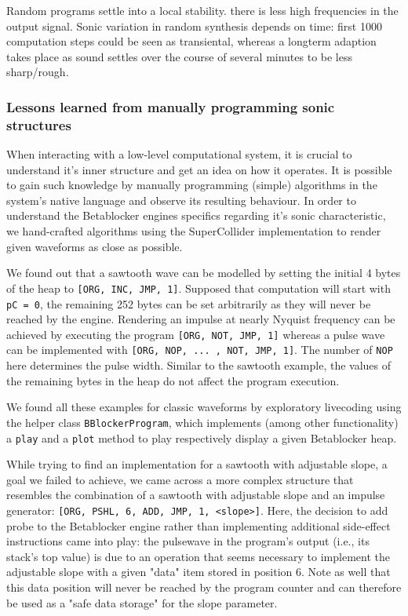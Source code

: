 \documentclass[letterpaper, 12pt]{article}
\begin{document}
Random programs settle into a local stability. there is less high frequencies in the output signal. 
Sonic variation in random synthesis depends on time: 
first 1000 computation steps could be seen as transiental, whereas a longterm adaption takes place as sound settles over the course of several minutes to be less sharp/rough.

\subsubsection{Lessons learned from manually programming sonic structures}
\label{sub:manual_programming_sonic_structures}

When interacting with a low-level computational system, it is crucial to  understand it's inner structure and get an idea on how it operates.
It is possible to gain such knowledge by manually programming (simple) algorithms in the system's native language and observe its resulting behaviour.
In order to understand the Betablocker engines specifics regarding it's sonic characteristic, we hand-crafted algorithms using the SuperCollider implementation to render given waveforms as close as possible.

We found out that a sawtooth wave can be modelled by setting the initial 4 bytes of the heap to
\texttt{[ORG, INC, JMP, 1]}.
Supposed that computation will start with \texttt{pC = 0}, the remaining 252 bytes can be set arbitrarily as they will never be reached by the engine.
Rendering an impulse at nearly Nyquist frequency can be achieved by executing the program \texttt{[ORG, NOT, JMP, 1]} whereas a pulse wave can be implemented with \texttt{[ORG, NOP, ... , NOT, JMP, 1]}.
The number of \texttt{NOP} here determines the pulse width.
Similar to the sawtooth example, the values of the remaining bytes in the heap do not affect the program execution.

We found all these examples for classic waveforms by exploratory livecoding using the helper class \texttt{BBlockerProgram}, which implements (among other functionality) a \texttt{play} and a \texttt{plot} method to play respectively display a given Betablocker heap.

While trying to find an implementation for a sawtooth with adjustable slope, a goal we failed to achieve, we came across a more complex structure that resembles the combination of a sawtooth with adjustable slope and an impulse generator: \texttt{[ORG, PSHL, 6, ADD, JMP, 1, <slope>]}. 
Here, the decision to add probe to the Betablocker engine rather than implementing additional side-effect instructions came into play: the pulsewave in the program's output (i.e., its stack's top value) is due to an operation that seems necessary to implement the adjustable slope with a given "data" item stored in position 6.
Note as well that this data position will never be reached by the program counter and can therefore be used as a "safe data storage" for the slope parameter.
\end{document}
